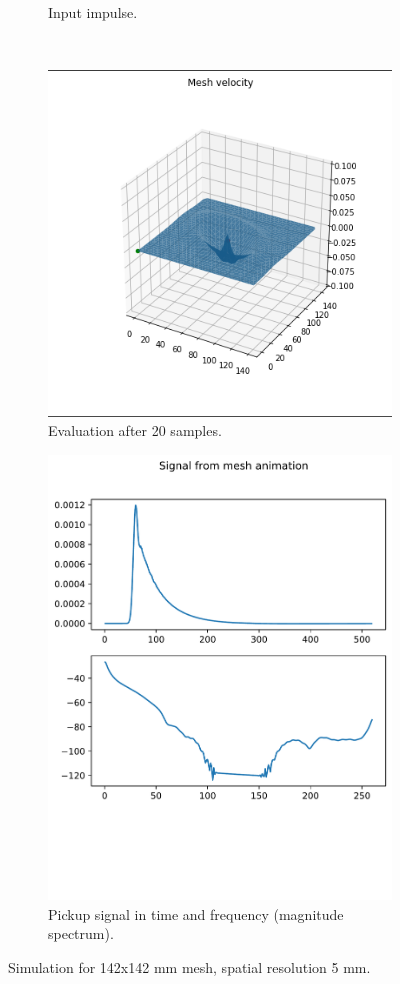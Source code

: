 \documentclass{article}
\begin{document}
\begin{figure}
\begin{subfigure}{.45\textwidth}
      \caption{Input impulse.}
      \label{fig:2d-impulse}
    \end{subfigure} \\
    \begin{subfigure}{.45\textwidth}
      \centering
      \includegraphics[width=0.8\linewidth]{fig/2d-sample20}
      \caption{Evaluation after 20 samples.}
      \label{fig:2d-sample20}
    \end{subfigure}
    \begin{subfigure}{.45\textwidth}
      \centering
      \includegraphics[width=0.8\linewidth]{fig/2d-pickup}
      \caption{Pickup signal in time and frequency (magnitude spectrum).}
      \label{fig:2d-pickup}
    \end{subfigure}
    \caption{Simulation for 142x142 mm mesh, spatial resolution 5 mm.}
    \label{fig:2dcase}
\end{figure}
\end{document}
